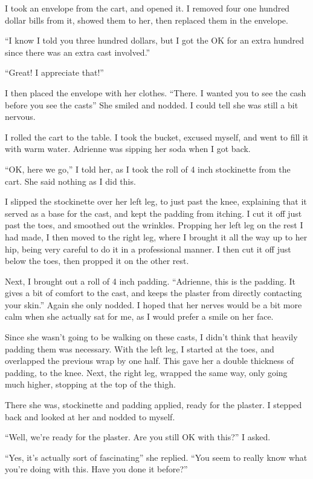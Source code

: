     I took an envelope from the cart, and opened it. I removed four one hundred dollar bills
from it, showed them to her, then replaced them in the envelope.

    ``I know I told you three hundred dollars, but I got the OK for an extra hundred since there
was an extra cast involved.''

    ``Great! I appreciate that!''

    I then placed the envelope with her clothes. ``There. I wanted you to see the cash before
you see the casts'' She smiled and nodded. I could tell she was still a bit nervous.

    I rolled the cart to the table. I took the bucket, excused myself, and went to fill it with
warm water. Adrienne was sipping her soda when I got back.

    ``OK, here we go,'' I told her, as I took the roll of 4 inch stockinette from the cart. She
said nothing as I did this.

    I slipped the stockinette over her left leg, to just past the knee, explaining that it
served as a base for the cast, and kept the padding from itching. I cut it off just past the
toes, and smoothed out the wrinkles. Propping her left leg on the rest I had made, I then moved
to the right leg, where I brought it all the way up to her hip, being very careful to do it in a
professional manner. I then cut it off just below the toes, then propped it on the other rest.

    Next, I brought out a roll of 4 inch padding. ``Adrienne, this is the padding. It gives a
bit of comfort to the cast, and keeps the plaster from directly contacting your skin.'' Again
she only nodded. I hoped that her nerves would be a bit more calm when she actually sat for me,
as I would prefer a smile on her face.

    Since she wasn't going to be walking on these casts, I didn't think that heavily padding
them was necessary. With the left leg, I started at the toes, and overlapped the previous wrap
by one half. This gave her a double thickness of padding, to the knee. Next, the right leg,
wrapped the same way, only going much higher, stopping at the top of the thigh.

    There she was, stockinette and padding applied, ready for the plaster. I stepped back and
looked at her and nodded to myself.

    ``Well, we're ready for the plaster. Are you still OK with this?'' I asked.

    ``Yes, it's actually sort of fascinating'' she replied. ``You seem to really know what
you're doing with this. Have you done it before?''

